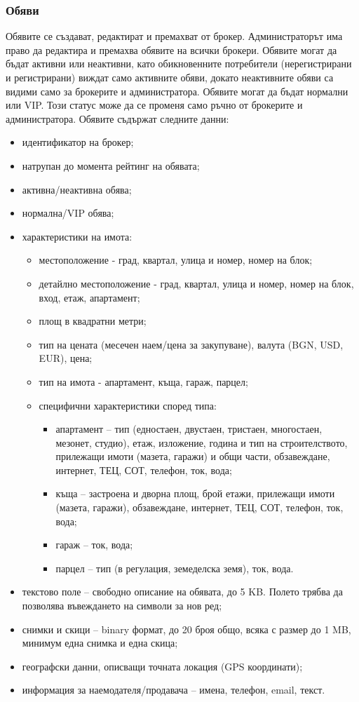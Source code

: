 \documentclass[a4paper]{article}
\begin{document}
\subsubsection{Обяви}

Обявите се създават, редактират и премахват от брокер. Администраторът има право да редактира и премахва обявите на всички брокери.	Обявите могат да бъдат активни или неактивни, като обикновенните потребители (нерегистрирани и регистрирани) виждат само активните обяви, докато неактивните обяви са видими само за брокерите и администратора.
Обявите могат да бъдат нормални или VIP. Този статус може да се променя само ръчно от брокерите и администратора.
Обявите съдържат следните данни:
	\begin{itemize}
	\item идентификатор на брокер;
	\item натрупан до момента рейтинг на обявата;
	\item активна/неактивна обява; 
	\item нормална/VIP обява;
	\item {характеристики на имота:
		\begin{itemize}
		\item местоположение - град, квартал, улица и номер, номер на блок;
		\item детайлно местоположение - град, квартал, улица и номер, номер на блок, вход, етаж, апартамент;
		\item площ в квадратни метри;
		\item тип на цената (месечен наем/цена за закупуване), валута (BGN, USD, EUR), цена;
		\item тип на имота - апартамент, къща, гараж, парцел;
		\item {специфични характеристики според типа:
			\begin{itemize}
			\item апартамент -- тип (едностаен, двустаен, тристаен, многостаен, мезонет, студио), етаж, изложение, година и тип на строителството, прилежащи имоти (мазета, гаражи) и общи части, обзавеждане, интернет, ТЕЦ, СОТ, телефон, ток, вода;
			\item къща -- застроена и дворна площ, брой етажи, прилежащи имоти (мазета, гаражи),	обзавеждане, интернет, ТЕЦ, СОТ, телефон, ток, вода;
			\item гараж -- ток, вода;
			\item парцел -- тип (в регулация, земеделска земя), ток, вода.
			\end{itemize}
		}
		\end{itemize}
	}
	\item текстово поле -- свободно описание на обявата, до 5 KB. Полето трябва да позволява въвеждането на символи за нов ред;
	\item снимки и скици -- binary формат, до 20 броя общо, всяка с размер до 1 MB, минимум една снимка и една скица; 
	\item географски данни, описващи точната локация (GPS координати);
	\item информация за наемодателя/продавача -- имена, телефон, email, текст.
	\end{itemize}
	
\end{document}
